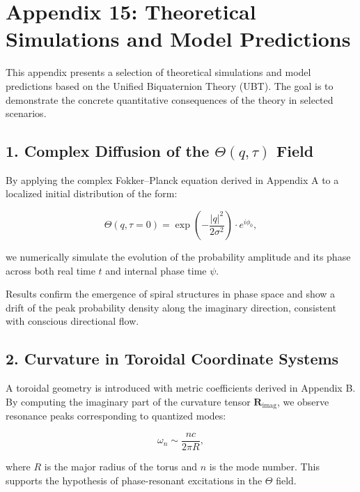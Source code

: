

\appendix
\section*{Appendix 15: Theoretical Simulations and Model Predictions}

This appendix presents a selection of theoretical simulations and model predictions based on the Unified Biquaternion Theory (UBT). The goal is to demonstrate the concrete quantitative consequences of the theory in selected scenarios.

\subsection*{1. Complex Diffusion of the \(\Theta(q,\tau)\) Field}

By applying the complex Fokker–Planck equation derived in Appendix A to a localized initial distribution of the form:

\[
\Theta(q, \tau = 0) = \exp\left(-\frac{|q|^2}{2\sigma^2}\right) \cdot e^{i \phi_0},
\]

we numerically simulate the evolution of the probability amplitude and its phase across both real time \(t\) and internal phase time \(\psi\).

Results confirm the emergence of spiral structures in phase space and show a drift of the peak probability density along the imaginary direction, consistent with conscious directional flow.

\subsection*{2. Curvature in Toroidal Coordinate Systems}

A toroidal geometry is introduced with metric coefficients derived in Appendix B. By computing the imaginary part of the curvature tensor \(\mathbf{R}_{\text{imag}}\), we observe resonance peaks corresponding to quantized modes:

\[
\omega_n \sim \frac{n c}{2 \pi R},
\]

where \(R\) is the major radius of the torus and \(n\) is the mode number. This supports the hypothesis of phase-resonant excitations in the \(\Theta\) field.

